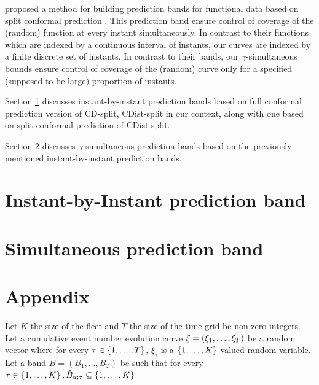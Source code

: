 \documentclass[11pt]{article}
\begin{document}
\citet{diquigiovanni2021importance} proposed a method for building prediction bands for functional data
based on split conformal prediction \citep{vovk2005algorithmic}.
This prediction band ensure control of coverage of the (random) function at every instant simultaneously.
In contrast to their functions which are indexed by a continuous interval of instants,
our curves are indexed by a finite discrete set of instants.
In contrast to their bands, our $\gamma$-simultaneous bounds
ensure control of coverage of the (random) curve only for a specified (supposed to be large) proportion of instants.


Section \ref{sec.ibib} discusses instant-by-instant prediction bands
based on full conformal prediction \citep{vovk2005algorithmic} version of CD-split, CDist-split in our context,
along with one based on split conformal prediction of CDist-split.

Section \ref{sec.simb} discusses $\gamma$-simultaneous prediction bands
based on the previously mentioned instant-by-instant prediction bands.

\section{Instant-by-Instant prediction band}
\label{sec.ibib}



\section{Simultaneous prediction band}
\label{sec.simb}


\printbibliography
%
%
%

\newpage
\section*{Appendix}
\renewcommand{\thesubsection}{\Alph{subsection}}

\begin{definition}
    Let $K$ the size of the fleet and $T$ the size of the time grid be non-zero integers.
    Let a cumulative event number evolution curve $\xi = \left( \xi_1, \ldots, \xi_T \right)$ be a random vector where
    for every  $\tau \in \left\{ 1, \ldots, T \right\}$, $\xi_{\tau}$ is a $\left\{ 1, \ldots, K \right\}$-valued random variable.
    Let a band $B = (B_{1}, \ldots, B_{T})$ be such that for every $\tau \in \left\{ 1, \ldots, K \right\}, \hat{B}_{\alpha; \tau} \subseteq \left\{ 1, \ldots, K \right\}$.
\end{definition}
\end{document}
